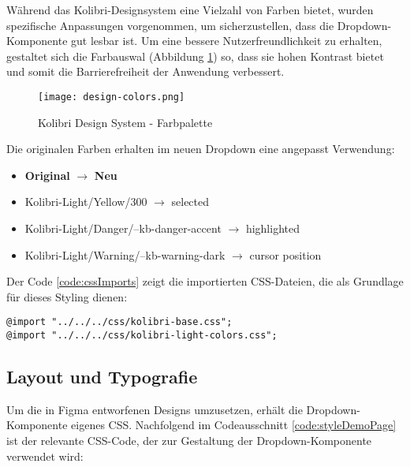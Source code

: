 Während das Kolibri-Designsystem eine Vielzahl von Farben bietet, wurden spezifische Anpassungen vorgenommen, um sicherzustellen, dass die Dropdown-Komponente gut lesbar ist. 
Um eine bessere Nutzerfreundlichkeit zu erhalten, gestaltet sich die Farbauswal (Abbildung \ref{img:designColors}) so, dass sie hohen Kontrast bietet und somit die Barrierefreiheit der Anwendung verbessert.

\begin{figure}[!htb]
    \centering
    \texttt{[image: design-colors.png]}
    \caption{Kolibri Design System - Farbpalette}
    \label{img:designColors}
\end{figure}

\noindent %
Die originalen Farben erhalten im neuen Dropdown eine angepasst Verwendung:

\begin{itemize}
    \item \textbf{Original} $\rightarrow$ \textbf{Neu}
    \item Kolibri-Light/Yellow/300 $\rightarrow$ selected
    \item Kolibri-Light/Danger/--kb-danger-accent $\rightarrow$ highlighted
    \item Kolibri-Light/Warning/--kb-warning-dark $\rightarrow$ cursor position
\end{itemize}

\noindent
Der Code \ref{code:cssImports} zeigt die importierten CSS-Dateien, die als Grundlage für dieses Styling dienen:

\begin{lstlisting}[style = htmlcssjs, caption = CSS Imports, label = code:cssImports]
@import "../../../css/kolibri-base.css";
@import "../../../css/kolibri-light-colors.css";
\end{lstlisting}


\subsection{Layout und Typografie}
\label{sec:layoutTypo}

Um die in Figma entworfenen Designs umzusetzen, erhält die Dropdown-Komponente eigenes CSS.
Nachfolgend im Codeausschnitt \ref{code:styleDemoPage} ist der relevante CSS-Code, der zur Gestaltung der Dropdown-Komponente verwendet wird:

